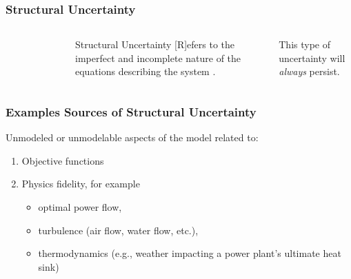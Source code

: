 \begin{frame}
    \frametitle{Structural Uncertainty}

    \begin{columns}
        \column[t]{4cm}
        \begin{figure}
            \centering
        \end{figure}

        \column[t]{6cm}
        \begin{block}{Structural Uncertainty}
            [R]efers to the imperfect and incomplete nature of the equations describing the system \cite{decarolis_using_2011}.
        \end{block}
        
        This type of uncertainty will \textit{always} persist.
    \end{columns}

\end{frame}

\begin{frame}
    \frametitle{Examples Sources of Structural Uncertainty}

    Unmodeled or unmodelable aspects of the model related to:

    \begin{enumerate}
        \item Objective functions
        \item Physics fidelity, for example
        \begin{itemize}
            \item optimal power flow,
            \item turbulence (air flow, water flow, etc.),
            \item thermodynamics (e.g., weather impacting a power plant's ultimate heat sink)
        \end{itemize} 
    \end{enumerate}

\end{frame}

